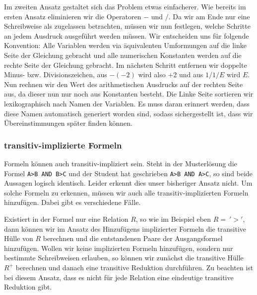 Im zweiten Ansatz gestaltet sich das Problem etwas einfacherer. Wie bereits im ersten Ansatz eliminieren wir die Operatoren $-$ und $/$. Da wir am Ende nur eine Schreibweise als zugelassen betrachten, müssen wir nun festlegen, welche Schritte an jedem Ausdruck ausgeführt werden müssen. Wir entscheiden uns für folgende Konvention: Alle Variablen werden via äquivalenten Umformungen auf die linke Seite der Gleichung gebracht und alle numerischen Konstanten werden auf die rechte Seite der Gleichung gebracht. Im nächsten Schritt entfernen wir doppelte Minus- bzw. Divisionszeichen, aus $-(-2)$ wird also $+2$ und aus $1/1/E$ wird $E$. Nun rechnen wir den Wert des arithmetischen Ausdrucks auf der rechten Seite aus, da dieser nun nur noch aus Konstanten besteht. Die Linke Seite sortieren wir lexikographisch nach Namen der Variablen. Es muss daran erinnert werden, dass diese Namen automatisch generiert worden sind, sodass sichergestellt ist, dass wir Übereinstimmungen später finden können.


\subsubsection{transitiv-implizierte Formeln}

Formeln können auch transitiv-impliziert sein. Steht in der Musterlösung die Formel \verb|A>B AND B>C| und der Student hat geschrieben \verb|A>B AND A>C|, so sind beide Aussagen logisch identisch. Leider erkennt dies unser bisheriger Ansatz nicht. Um solche Formeln zu erkennen, müssen wir auch alle transitiv-implizierten Formeln hinzufügen. Dabei gibt es verschiedene Fälle. 

Existiert in der Formel nur eine Relation $R$, so wie im Beispiel eben $R=\ '>'$, dann können wir im Ansatz des Hinzufügens implizierter Formeln die transitive Hülle von $R$ berechnen und die entstandenen Paare der Ausgangsformel hinzufügen. Wollen wir keine implizierten Formeln hinzufügen, sondern nur bestimmte Schreibweisen erlauben, so können wir zunächst die transitive Hülle $R^+$ berechnen und danach eine transitive Reduktion durchführen. Zu beachten ist bei diesem Ansatz, dass es nicht für jede Relation eine eindeutige transitive Reduktion gibt. 

